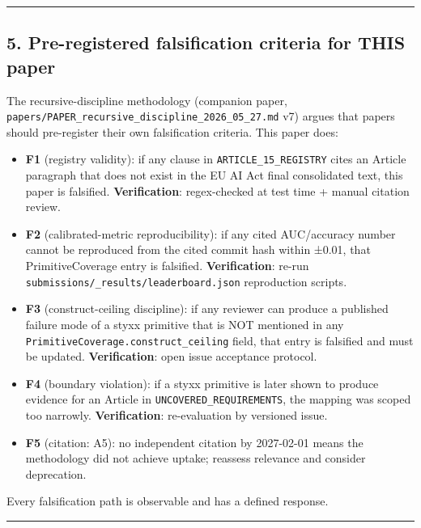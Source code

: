 \documentclass[
]{article}
\providecommand{\tightlist}{%
  \setlength{\itemsep}{0pt}\setlength{\parskip}{0pt}}
\begin{document}
\begin{center}\rule{0.5\linewidth}{0.5pt}\end{center}

\subsection{5. Pre-registered falsification criteria for THIS
paper}\label{pre-registered-falsification-criteria-for-this-paper}

The recursive-discipline methodology (companion paper,
\texttt{papers/PAPER\_recursive\_discipline\_2026\_05\_27.md} v7) argues
that papers should pre-register their own falsification criteria. This
paper does:

\begin{itemize}
\tightlist
\item
  \textbf{F1} (registry validity): if any clause in
  \texttt{ARTICLE\_15\_REGISTRY} cites an Article paragraph that does
  not exist in the EU AI Act final consolidated text, this paper is
  falsified. \textbf{Verification}: regex-checked at test time + manual
  citation review.
\item
  \textbf{F2} (calibrated-metric reproducibility): if any cited
  AUC/accuracy number cannot be reproduced from the cited commit hash
  within ±0.01, that PrimitiveCoverage entry is falsified.
  \textbf{Verification}: re-run
  \texttt{submissions/\_results/leaderboard.json} reproduction scripts.
\item
  \textbf{F3} (construct-ceiling discipline): if any reviewer can
  produce a published failure mode of a styxx primitive that is NOT
  mentioned in any \texttt{PrimitiveCoverage.construct\_ceiling} field,
  that entry is falsified and must be updated. \textbf{Verification}:
  open issue acceptance protocol.
\item
  \textbf{F4} (boundary violation): if a styxx primitive is later shown
  to produce evidence for an Article in
  \texttt{UNCOVERED\_REQUIREMENTS}, the mapping was scoped too narrowly.
  \textbf{Verification}: re-evaluation by versioned issue.
\item
  \textbf{F5} (citation: A5): no independent citation by 2027-02-01
  means the methodology did not achieve uptake; reassess relevance and
  consider deprecation.
\end{itemize}

Every falsification path is observable and has a defined response.

\begin{center}\rule{0.5\linewidth}{0.5pt}\end{center}
\end{document}
